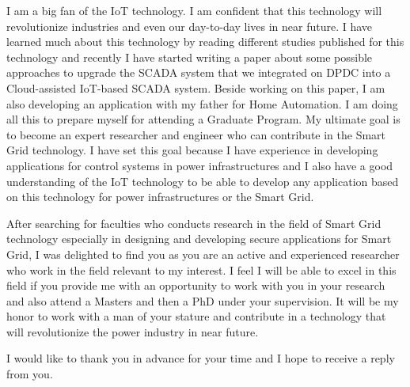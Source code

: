 \documentclass[11pt,a4paper,sans]{moderncv}        %
\begin{document}
I am a big fan of the IoT technology. I am confident that this technology will revolutionize industries and even our day-to-day lives in near future. I have learned much about this technology by reading different studies published for this technology and recently I have started writing a paper about some possible approaches to upgrade the SCADA system that we integrated on DPDC into a Cloud-assisted IoT-based SCADA system. Beside working on this paper, I am also developing an application with my father for Home Automation. I am doing all this to prepare myself for attending a Graduate Program. My ultimate goal is to become an expert researcher and engineer who can contribute in the Smart Grid technology. I have set this goal because I have experience in developing applications for control systems in power infrastructures and I also have a good understanding of the IoT technology to be able to develop any application based on this technology for power infrastructures or the Smart Grid.   

After searching for faculties who conducts research in the field of Smart Grid technology especially in designing and developing secure applications for Smart Grid, I was delighted to find you as you are an active and experienced researcher who work in the field relevant to my interest. I feel I will be able to excel in this field if you provide me with an opportunity to work with you in your research and also attend a Masters and then a PhD under your supervision. It will be my honor to work with a man of your stature and contribute in a technology that will revolutionize the power industry in near future.

I would like to thank you in advance for your time and I hope to receive a reply from you.

\vspace{8pt}
\makeletterclosing
\end{document}
